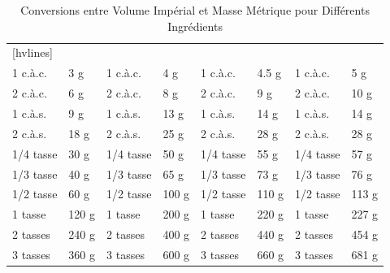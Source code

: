 \begin{table}
	\centering
	\caption{Conversions entre Volume Impérial et Masse Métrique pour Différents Ingrédients}
	\def\arraystretch{2}
	\begin{NiceTabular}{*{8}{m{.1\textwidth}}}[hvlines]
		 &       &  &       &        &       &             \\
		1 c.à.c.                       & 3 g   & 1 c.à.c.                            & 4 g   & 1 c.à.c.                                 & 4.5 g & 1 c.à.c.                          & 5 g   \\
		2 c.à.c.                       & 6 g   & 2 c.à.c.                            & 8 g   & 2 c.à.c.                                 & 9 g   & 2 c.à.c.                          & 10 g  \\
		1 c.à.s.                       & 9 g   & 1 c.à.s.                            & 13 g  & 1 c.à.s.                                 & 14 g  & 1 c.à.s.                          & 14 g  \\
		2 c.à.s.                       & 18 g  & 2 c.à.s.                            & 25 g  & 2 c.à.s.                                 & 28 g  & 2 c.à.s.                          & 28 g  \\
		1/4 tasse                      & 30 g  & 1/4 tasse                           & 50 g  & 1/4 tasse                                & 55 g  & 1/4 tasse                         & 57 g  \\
		1/3 tasse                      & 40 g  & 1/3 tasse                           & 65 g  & 1/3 tasse                                & 73 g  & 1/3 tasse                         & 76 g  \\
		1/2 tasse                      & 60 g  & 1/2 tasse                           & 100 g & 1/2 tasse                                & 110 g & 1/2 tasse                         & 113 g \\
		1 tasse                        & 120 g & 1 tasse                             & 200 g & 1 tasse                                  & 220 g & 1 tasse                           & 227 g \\
		2 tasses                       & 240 g & 2 tasses                            & 400 g & 2 tasses                                 & 440 g & 2 tasses                          & 454 g \\
		3 tasses                       & 360 g & 3 tasses                            & 600 g & 3 tasses                                 & 660 g & 3 tasses                          & 681 g \\

\end{NiceTabular}
\end{table}
